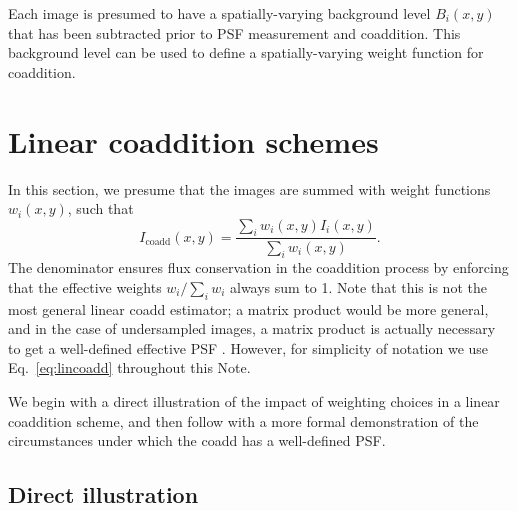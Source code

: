 \documentclass[modern]{style_and_logos/lsstdescnote}
\begin{document}
Each image is presumed to have a spatially-varying background level $B_i(x,y)$ that has been subtracted prior to PSF measurement and coaddition.  This background level can be used to define a spatially-varying weight function for coaddition.

\section{Linear coaddition schemes}\label{sec:lin}

In this section, we presume that the images are summed with weight functions $w_i(x,y)$, such that
\begin{equation}\label{eq:lincoadd}
    I_\text{coadd}(x,y) = \frac{\sum_i w_i(x,y) I_i(x,y)}{\sum_i w_i(x,y)}.
\end{equation}
The denominator ensures flux conservation in the coaddition process by enforcing that the effective weights $w_i/\sum_i w_i$ always sum to 1. Note that this is not the most general linear coadd estimator; a matrix product would be more general, and in the case of undersampled images, a matrix product is actually necessary to get a well-defined effective PSF \citep{2011ApJ...741...46R}.  However, for simplicity of notation we use Eq.~\eqref{eq:lincoadd} throughout this Note.

We begin with a direct illustration of the impact of weighting choices in a linear coaddition scheme, and then follow with a more formal demonstration of the circumstances under which the coadd has a well-defined PSF.

\subsection{Direct illustration}\label{subsec:direct}
\end{document}
